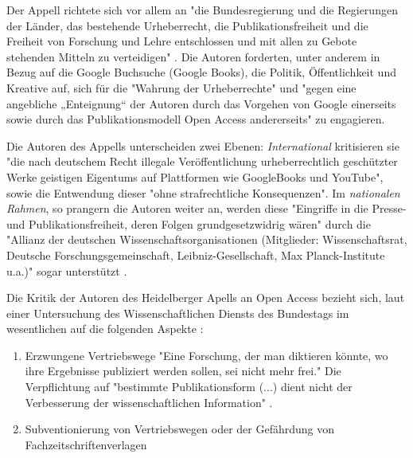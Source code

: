 Der Appell richtete sich vor allem an "die Bundesregierung und die Regierungen der Länder, das bestehende Urheberrecht, die Publikationsfreiheit und die Freiheit von Forschung und Lehre entschlossen und mit allen zu Gebote stehenden Mitteln zu verteidigen" \cite{ITK_2009}. Die Autoren forderten, unter anderem in Bezug auf die Google Buchsuche (Google Books), die Politik, Öffentlichkeit und Kreative auf, sich für die "Wahrung der Urheberrechte" und "gegen eine angebliche „Enteignung“ der Autoren durch das Vorgehen von Google einerseits sowie durch das Publikationsmodell Open Access andererseits" \cite{WD_bundestag_2009} zu engagieren.

Die Autoren des Appells unterscheiden zwei Ebenen: \textit{International} kritisieren sie "die nach deutschem Recht illegale Veröffentlichung urheberrechtlich geschützter Werke geistigen Eigentums auf Plattformen wie GoogleBooks und YouTube", sowie die Entwendung dieser "ohne strafrechtliche Konsequenzen". Im \textit{nationalen Rahmen}, so prangern die Autoren weiter an, werden diese "Eingriffe in die Presse- und Publikationsfreiheit, deren Folgen grundgesetzwidrig wären" durch die "Allianz der deutschen Wissenschaftsorganisationen (Mitglieder: Wissenschaftsrat, Deutsche Forschungsgemeinschaft, Leibniz-Gesellschaft, Max Planck-Institute u.a.)" sogar unterstützt \cite{ITK_2009}.

Die Kritik der Autoren des Heidelberger Apells an Open Access bezieht sich, laut einer Untersuchung des Wissenschaftlichen Diensts des Bundestags im wesentlichen auf die folgenden Aspekte \cite{WD_bundestag_2009}:
\begin{enumerate}
\item Erzwungene Vertriebswege
"Eine Forschung, der man diktieren könnte, wo ihre Ergebnisse publiziert werden sollen, sei nicht mehr frei." Die Verpflichtung auf "bestimmte Publikationsform (...) dient nicht der Verbesserung der wissenschaftlichen Information" \cite{ITK_2009}.
\item Subventionierung von Vertriebswegen oder der Gefährdung von Fachzeitschriftenverlagen \cite{ITK_2009}
\end{enumerate}

